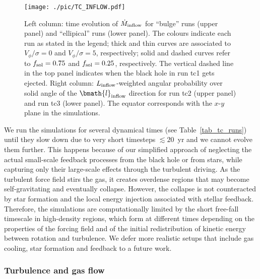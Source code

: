 \documentclass[a4paper,fleqn,usenatbib]{mnras}
\begin{document}
\begin{figure*}
\begin{center}
\texttt{[image: ./pic/TC\_INFLOW.pdf]}
\caption{Left column: time evolution of $\dot{M}_{\rm inflow}$ for ``bulge'' runs (upper panel) and ``ellipical'' runs (lower panel).
The colours indicate each run as stated in the legend; thick and thin curves are associated to $V_{\phi} / \sigma = 0$ and $V_{\phi} / \sigma = 5$, respectively; 
solid and dashed curves refer to $f_{\rm sol} = 0.75$ and $f_{\rm sol} = 0.25$, respectively.
The vertical dashed line in the top panel indicates when the black hole in run tc1 gets ejected.
Right column: $L_{\rm inflow}$-weighted angular probability over solid angle of the $\bmath{l}_{\rm inflow}$ direction for run tc2 (upper panel) and run tc3 (lower panel).
The equator corresponds with the $x$-$y$ plane in the simulations.
}
\label{fig_tc_inflow}
\end{center}
\end{figure*}

We run the simulations for several dynamical times (see Table~\ref{tab_tc_runs}) until they slow down due to very short timesteps $\lesssim 20$~yr and we cannot evolve them further.
This happens because of our simplified approach of neglecting the actual small-scale feedback processes from the black hole or from stars, while capturing only their large-scale effects through the turbulent driving.
As the turbulent force field stirs the gas, it creates overdense regions that may become self-gravitating and eventually collapse.
However, the collapse is not counteracted by star formation and the local energy injection associated with stellar feedback.
Therefore, the simulations are computationally limited by the short free-fall timescale in high-density regions, which form at different times depending on the properties of the forcing field and of the initial redistribution of kinetic energy between rotation and turbulence.
We defer more realistic setups that include gas cooling, star formation and feedback to a future work.

\subsubsection{Turbulence and gas flow}
\end{document}
